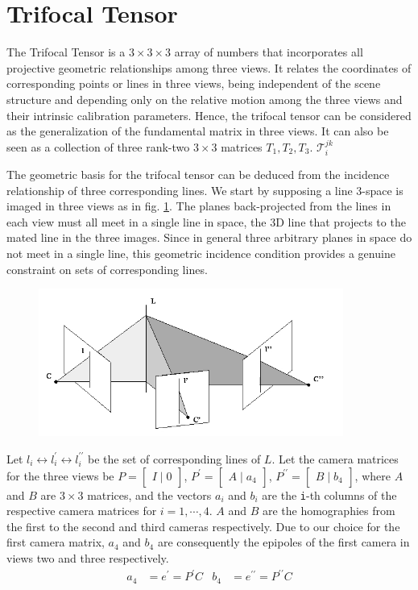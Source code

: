 \section*{Trifocal Tensor}
The Trifocal Tensor is a $3 \times 3 \times 3$ array of numbers that incorporates all projective geometric relationships among three views. It relates the coordinates of corresponding points or lines in three views, being independent of the scene structure and depending only on the relative motion among the three views and their intrinsic calibration parameters. Hence, the trifocal tensor can be considered as the generalization of the fundamental matrix in three views. It can also be seen as a collection of three rank-two $3 \times 3$ matrices $T_1, T_2, T_3$.
$\mathcal{T}_{i}^{jk}$ 

The geometric basis for the trifocal tensor can be deduced from the incidence relationship of three corresponding lines. We start by supposing a line 3-space is imaged in three views as in fig. \ref{fig:threeviews}. The planes back-projected from the lines in each view must all meet in a single line in space, the 3D line that projects to the mated line in the three images. Since in general three arbitrary planes in space do not meet in a single line, this geometric incidence condition provides a genuine constraint on sets of corresponding lines. 

\begin{figure}[ht!]
  \centering
  \includegraphics[width=100mm]{figures/threeviews.jpg}
  \caption{}
  \label{fig:threeviews}
\end{figure}

Let $ l_i \leftrightarrow l^{\prime}_i \leftrightarrow l^{\prime \prime}_i $ be the set of corresponding lines of $L$. Let the camera matrices for the three views be $P =  \begin{bmatrix} I \mid 0 \end{bmatrix}$, $P^{\prime} = \begin{bmatrix} A \mid a_{4} \end{bmatrix}$, $P^{\prime \prime} = \begin{bmatrix} B \mid b_{4} \end{bmatrix}$, where $A$ and $B$ are $3 \times 3$ matrices, and the vectors $a_i$ and $b_i$ are the \texttt{i}-th columns of the respective camera matrices for $i = 1,\dotsb,4$. $A$ and $B$ are the homographies from the first to the second and third cameras respectively. Due to our choice for the first camera matrix, $a_4$ and $b_4$ are consequently the epipoles of the first camera in views two and three respectively.
 \begin{align*}
  a_4 &= e^{\prime} = P^{\prime}C  & b_4 &= e^{\prime \prime}  = P^{\prime \prime}C
 \end{align*}

